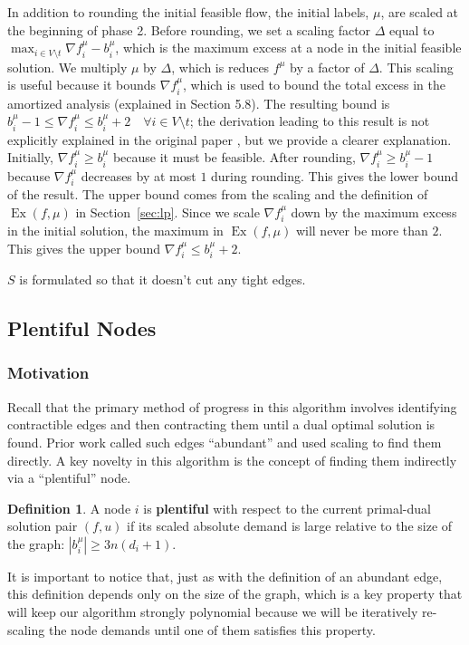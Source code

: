\documentclass[11pt]{article}
\theoremstyle{definition}
\newtheorem{definition}{Definition}[section]
\theoremstyle{definition}
\newcommand{\fu}{f^{\mu}}
\newcommand{\nfiu}{\nabla \fu_i}
\newcommand{\biu}{b_{i}^{\mu}}
\DeclareMathOperator{\Ex}{Ex}
\begin{document}
    In addition to rounding the initial feasible flow, the initial labels, $\mu$, are scaled at the beginning of phase 2. Before rounding, we set a scaling factor $\Delta$ equal to $\max_{i \in V \setminus t} \nfiu - \biu$, which is the maximum excess at a node in the initial feasible solution. We multiply $\mu$ by $\Delta$, which is reduces $f^\mu$ by a factor of $\Delta$. This scaling is useful because it bounds $\nfiu$, which is used to bound the total excess in the amortized analysis (explained in Section 5.8). The resulting bound is $\biu - 1 \leq \nfiu \leq \biu + 2 \quad \forall i \in V \setminus t $; the derivation leading to this result is not explicitly explained in the original paper \cite{Olver2017}, but we provide a clearer explanation. Initially, $\nfiu \geq \biu$ because it must be feasible. After rounding, $\nfiu \geq \biu - 1$ because $\nfiu$ decreases by at most $1$ during rounding. This gives the lower bound of the result. The upper bound comes from the scaling and the definition of $\Ex(f, \mu)$ in Section~\ref{sec:lp}. Since we scale $\nfiu$ down by the maximum excess in the initial solution, the maximum in $\Ex(f,\mu)$ will never be more than $2$. This gives the upper bound $\nfiu \leq \biu + 2$. 

$S$ is formulated so that it doesn't cut any tight edges. 
\subsection{Plentiful Nodes}

\subsubsection{Motivation}

Recall that the primary method of progress in this algorithm involves
identifying contractible edges and then contracting them until a dual optimal
solution is found. Prior work called such edges ``abundant'' and used scaling to
find them directly. A key novelty in this algorithm is the concept of finding
them indirectly via a ``plentiful'' node. 
\begin{definition}
A node $i$ is \textbf{plentiful} with respect
to the current primal-dual solution pair $(f,u)$ if its scaled absolute
demand is large relative to the size of the graph: $|b_i^{\mu}| \ge 3n(d_i + 1)$.
\end{definition}

It is important to notice that, just as with the definition of an abundant  edge,
this definition depends only on the size of the graph, which is a key property
that will keep our algorithm strongly polynomial because we will be iteratively
re-scaling the node demands until one of them satisfies this property.
\end{document}
